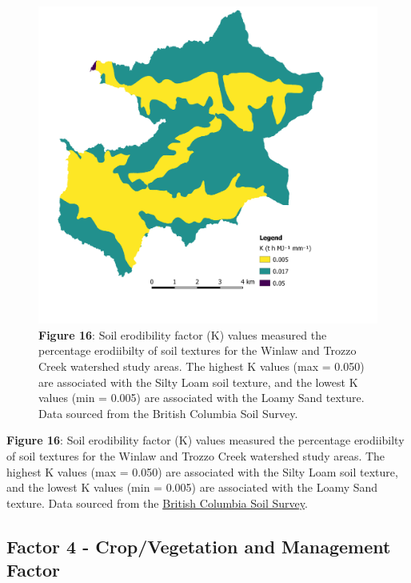\documentclass[
]{article}
\begin{document}
\begin{figure}
\centering
\includegraphics{img/k_factor.png}
\caption{\textbf{Figure 16}: Soil erodibility factor (K) values measured the percentage erodiibilty of soil textures for the Winlaw and Trozzo Creek watershed study areas. The highest K values (max = 0.050) are associated with the Silty Loam soil texture, and the lowest K values (min = 0.005) are associated with the Loamy Sand texture. Data sourced from the British Columbia Soil Survey.}
\end{figure}

\textbf{Figure 16}: Soil erodibility factor (K) values measured the percentage erodiibilty of soil textures for the Winlaw and Trozzo Creek watershed study areas. The highest K values (max = 0.050) are associated with the Silty Loam soil texture, and the lowest K values (min = 0.005) are associated with the Loamy Sand texture. Data sourced from the \href{https://catalogue.data.gov.bc.ca/dataset/20150a67-5a2d-425f-8216-ff0f97f68df9}{British Columbia Soil Survey}.

\hypertarget{sec-factor-4}{%
\subsection*{Factor 4 - Crop/Vegetation and Management Factor}\label{sec-factor-4}}
\end{document}

